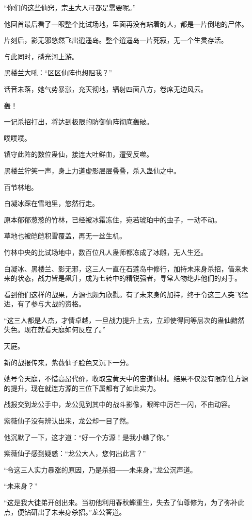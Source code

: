 \begin{this_body}
“你们的这些仙窍，宗主大人可都是需要呢。”

他回首最后看了一眼整个比试场地，里面再没有站着的人，都是一片倒地的尸体。

片刻后，影无邪悠然飞出逍遥岛。整个逍遥岛一片死寂，无一个生灵存活。

与此同时，磷光河上游。

黑楼兰大吼：“区区仙阵也想阻我？”

话音未落，她气势暴涨，充天彻地，辐射四面八方，卷席无边风云。

轰！

一记杀招打出，将达到极限的防御仙阵彻底轰破。

噗噗噗。

镇守此阵的数位蛊仙，接连大吐鲜血，遭受反噬。

黑楼兰狞笑一声，身上力道虚影层层叠叠，杀入蛊仙之中。

百节林地。

白凝冰踩在雪地里，悠然行走。

原本郁郁葱葱的竹林，已经被冰霜冻住，宛若琥珀中的虫子，一动不动。

草地也被皑皑积雪覆盖，再无一丝生机。

竹林中央的比试场地中，数百位凡人蛊师都冻成了冰雕，无人生还。

白凝冰、黑楼兰、影无邪，这三人一直在石莲岛中修行，加持未来身杀招，借来未来的状态，战力皆是飙升，成为七转中的精锐强者，寻常人物绝非他们的对手。

看到他们这样的战果，方源也颇为欣慰。有了未来身的加持，终于令这三人突飞猛进，有了参与大战的资格。

“这三人都是人杰，才情卓越，一旦战力提升上去，立即使得同等层次的蛊仙黯然失色。现在就看天庭如何反应了。”

天庭。

新的战报传来，紫薇仙子脸色又沉下一分。

她号令天庭，不惜高昂代价，收取宝黄天中的宙道仙材。结果不仅没有限制住方源的提升，现在就连方源的三位下属都有了如此实力。

战报交到龙公手中，龙公见到其中的战斗影像，眼眸中厉芒一闪，不由动容。

紫薇仙子没有辨认出来，龙公却一目了然。

他沉默了一下，这才道：“好一个方源！是我小瞧了你。”

紫薇仙子感到疑惑：“龙公大人，您何出此言？”

“令这三人实力暴涨的原因，乃是杀招――未来身。”龙公沉声道。

“未来身？”

“这是我大徒弟开创出来。当初他利用春秋蝉重生，失去了仙尊修为，为了弥补此点，便钻研出了未来身杀招。”龙公答道。


\end{this_body}
